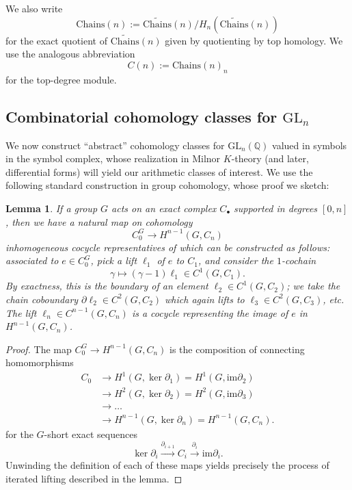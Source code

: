 \documentclass[10pt]{amsart}
\newtheorem{lem}[thm]{Lemma}
\theoremstyle{definition}
\newcommand{\Chains}{\mathrm{Chains}}
\numberwithin{equation}{section}
\begin{document}
    We also write
    \[
    \Chains(n) := \widetilde{\Chains}(n)/H_n(\widetilde{\Chains}(n))
    \]
    for the exact quotient of $\widetilde{\Chains}(n)$ given by quotienting by top homology. We use the analogous abbreviation
    \[
    C(n):= \Chains(n)_n
    \]
    for the top-degree module.
    
    \subsection{Combinatorial cohomology classes for $\mathrm{GL}_n$} \label{section:comb}

    We now construct ``abstract'' cohomology classes for $\mathrm{GL}_n(\mathbb{Q})$ valued in symbols in the symbol complex, whose realization in Milnor $K$-theory (and later, differential forms) will yield our arithmetic classes of interest. We use the following standard construction in group cohomology, whose proof we sketch:

    \begin{lem} \label{lem:groupcohom}
        If a group $G$ acts on an exact complex $C_\bullet$ supported in degrees $[0,n]$, then we have a natural map on cohomology
        \[
        C_0^G \to H^{n-1} (G, C_n)
        \]
        inhomogeneous cocycle representatives of which can be constructed as follows: associated to $e\in C_0^G$, pick a lift $\ell_1$ of $e$ to $C_1$, and consider the $1$-cochain
        \[
        \gamma\mapsto (\gamma-1)\ell_1 \in C^1(G, C_1).
        \]
        By exactness, this is the boundary of an element $\ell_2\in C^1(G,C_2)$; we take the chain coboundary $\partial \ell_2 \in C^2(G,C_2)$ which again lifts to $\ell_3\in C^2(G,C_3)$, etc. The lift $\ell_n\in C^{n-1}(G,C_n)$ is a cocycle representing the image of $e$ in $H^{n-1} (G, C_n)$.
    \end{lem}
    \begin{proof}
        The map $C_0^G \to H^{n-1} (G, C_n)$ is the composition of connecting homomorphisms
        \begin{align}
        C_0 & \to H^1(G, \ker \partial_1) = H^1(G, \mathrm{im } \partial_2)\\
            & \to H^2(G, \ker \partial_2) = H^2(G, \mathrm{im } \partial_3) \\
            & \to \ldots \\
            & \to H^{n-1}(G, \ker \partial_n)=H^{n-1}(G, C_n).
        \end{align}
        for the $G$-short exact sequences
        \[
        \ker \partial_i \xrightarrow{\partial_{i+1}} C_i \xrightarrow{\partial_i} \mathrm{im }\partial_i.
        \]
        Unwinding the definition of each of these maps yields precisely the process of iterated lifting described in the lemma.
    \end{proof}
\end{document}
